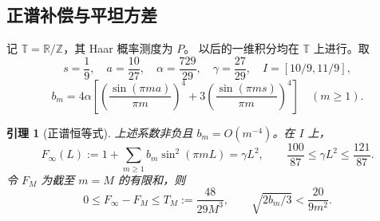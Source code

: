 \documentclass[UTF8,a4paper,11pt,fontset=fandol]{ctexart}
\newtheorem{lemma}{引理}[section]
\theoremstyle{remark}
\begin{document}
\subsection{正谱补偿与平坦方差}
记 $\mathbb T=\mathbb R/\mathbb Z$，其 Haar 概率测度为 $P$。
以后的一维积分均在 $\mathbb T$ 上进行。取
\[
 s=\frac19,\quad a=\frac{10}{27},\quad\alpha=\frac{729}{29},
 \quad\gamma=\frac{27}{29},\quad I=[10/9,11/9],
\]
\[
 b_m=4\alpha\left[\left(\frac{\sin(\pi ma)}{\pi m}\right)^4
 +3\left(\frac{\sin(\pi ms)}{\pi m}\right)^4\right]\quad(m\ge1).
\]
\begin{lemma}[正谱恒等式]\label{lem:paperplateau}
上述系数非负且 $b_m=O(m^{-4})$。在 $I$ 上，
\[
 F_\infty(L):=1+\sum_{m\ge1}b_m\sin^2(\pi mL)=\gamma L^2,
 \qquad \frac{100}{87}\le\gamma L^2\le\frac{121}{87}.
\]
令 $F_M$ 为截至 $m=M$ 的有限和，则
\[
 0\le F_\infty-F_M\le T_M:=\frac{48}{29M^3},\qquad
 \sqrt{2b_m/3}<\frac{20}{9m^2}.
\]
\end{lemma}
\end{document}
